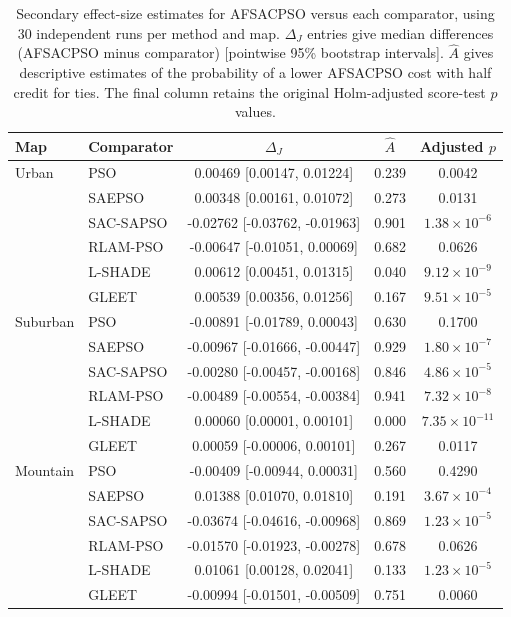 \begin{table}[htbp]
\centering\small\setlength{\tabcolsep}{4pt}
\caption{Secondary effect-size estimates for AFSACPSO versus each comparator, using 30 independent runs per method and map. $\Delta_J$ entries give median differences (AFSACPSO minus comparator) [pointwise 95\% bootstrap intervals]. $\widehat A$ gives descriptive estimates of the probability of a lower AFSACPSO cost with half credit for ties. The final column retains the original Holm-adjusted score-test $p$ values.}
\label{tab:effect-sizes}
\begin{tabular}{llccc}\toprule
Map & Comparator & $\Delta_J$ & $\widehat A$ & Adjusted $p$\\\midrule
Urban & PSO & 0.00469 [0.00147, 0.01224] & 0.239 & 0.0042\\
 & SAEPSO & 0.00348 [0.00161, 0.01072] & 0.273 & 0.0131\\
 & SAC-SAPSO & -0.02762 [-0.03762, -0.01963] & 0.901 & $1.38\times10^{-6}$\\
 & RLAM-PSO & -0.00647 [-0.01051, 0.00069] & 0.682 & 0.0626\\
 & L-SHADE & 0.00612 [0.00451, 0.01315] & 0.040 & $9.12\times10^{-9}$\\
 & GLEET & 0.00539 [0.00356, 0.01256] & 0.167 & $9.51\times10^{-5}$\\
\midrule
Suburban & PSO & -0.00891 [-0.01789, 0.00043] & 0.630 & 0.1700\\
 & SAEPSO & -0.00967 [-0.01666, -0.00447] & 0.929 & $1.80\times10^{-7}$\\
 & SAC-SAPSO & -0.00280 [-0.00457, -0.00168] & 0.846 & $4.86\times10^{-5}$\\
 & RLAM-PSO & -0.00489 [-0.00554, -0.00384] & 0.941 & $7.32\times10^{-8}$\\
 & L-SHADE & 0.00060 [0.00001, 0.00101] & 0.000 & $7.35\times10^{-11}$\\
 & GLEET & 0.00059 [-0.00006, 0.00101] & 0.267 & 0.0117\\
\midrule
Mountain & PSO & -0.00409 [-0.00944, 0.00031] & 0.560 & 0.4290\\
 & SAEPSO & 0.01388 [0.01070, 0.01810] & 0.191 & $3.67\times10^{-4}$\\
 & SAC-SAPSO & -0.03674 [-0.04616, -0.00968] & 0.869 & $1.23\times10^{-5}$\\
 & RLAM-PSO & -0.01570 [-0.01923, -0.00278] & 0.678 & 0.0626\\
 & L-SHADE & 0.01061 [0.00128, 0.02041] & 0.133 & $1.23\times10^{-5}$\\
 & GLEET & -0.00994 [-0.01501, -0.00509] & 0.751 & 0.0060\\
\bottomrule\end{tabular}
\end{table}
